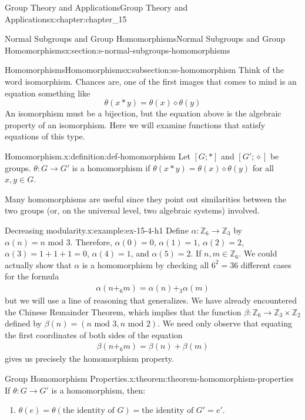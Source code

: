 \documentclass[oneside,10pt,]{book}
\numberwithin{equation}{section}
\begin{document}
\begin{chapterptx}{Group Theory and Applications}{}{Group Theory and Applications}{}{}{x:chapter:chapter_15}
\begin{sectionptx}{Normal Subgroups and Group Homomorphisms}{}{Normal Subgroups and Group Homomorphisms}{}{}{x:section:s-normal-subgroups-homomorphisms}
\begin{subsectionptx}{Homomorphisms}{}{Homomorphisms}{}{}{x:subsection:ss-homomorphism}
Think of the word isomorphism. Chances are, one of the first images that comes to mind is an equation something like%
\begin{equation*}
\theta(x * y) = \theta(x) \diamond  \theta(y)
\end{equation*}
An isomorphism must be a bijection, but the equation above is the algebraic property of an isomorphism. Here we will examine functions that satisfy equations of this type.%
\begin{definition}{Homomorphism.}{x:definition:def-homomorphism}%
%
Let \([G; *]\) and \([G';\diamond ]\) be groups. \(\theta:G \to G'\) is a homomorphism if \(\theta(x * y) = \theta(x) \diamond  \theta(y)\) for all \(x, y \in G\).%
\end{definition}
Many homomorphisms are useful since they point out similarities between the two groups (or, on the universal level, two algebraic systems) involved.%
\begin{example}{Decreasing modularity.}{x:example:ex-15-4-h1}%
Define \(\alpha:\mathbb{Z}_6\to \mathbb{Z}_3\) by \(\alpha(n)=n \textrm{ mod } 3\). Therefore, \(\alpha(0) = 0\), \(\alpha(1) = 1\), \(\alpha(2) = 2\), \(\alpha(3) =1 + 1 + 1=0\), \(\alpha(4) = 1\), and \(\alpha(5) = 2\). If \(n, m \in \mathbb{Z}_6\).  We could actually show that \(\alpha\) is a homomorphism by checking all \(6^2=36\) different cases for the formula%
\begin{gather}
\alpha(n +_6 m) = \alpha(n)+_3\alpha(m)\label{x:mrow:ex-15-4-h2}
\end{gather}
but we will use a line of reasoning that generalizes. We have already encountered the Chinese Remainder Theorem, which implies that the function \(\beta: \mathbb{Z}_6\to \mathbb{Z}_3 \times \mathbb{Z}_2\) defined by \(\beta(n)=(n\textrm{ mod } 3, n\textrm{ mod } 2)\). We need only observe that equating the first coordinates of both sides of the equation%
\begin{gather}
\beta(n +_6 m) = \beta(n)+\beta(m)\label{g:mrow:idm546592956272}
\end{gather}
gives us precisely the homomorphism property.%
\end{example}
\begin{theorem}{Group Homomorphism Properties.}{}{x:theorem:theorem-homomorphism-properties}%
If \(\theta: G \rightarrow  G'\) is a homomorphism, then:%
\begin{enumerate}[label=(\alph*)]
\item{}\(\theta(e) =\theta(\textrm{the identity of } G) = \textrm{the identity of } G' = e'\).%

\end{enumerate}
\end{theorem}
\end{subsectionptx}
\end{sectionptx}
\end{chapterptx}
\end{document}
